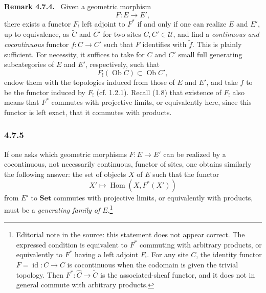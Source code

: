 \documentclass[11pt]{article}
\newcommand{\U}{\mathcal{U}}
\newcommand{\Set}{\mathbf{Set}}
\newcommand{\Hom}{\operatorname{Hom}}
\newcommand{\Ob}{\operatorname{Ob}}
\newenvironment{remarktext}[1]{\par\medskip\noindent\textbf{#1.}\ }{\par\medskip}
\providecommand{\Ob}{\operatorname{Ob}}
\begin{document}
\begin{remarktext}{Remark 4.7.4}
Given a geometric morphism
\[
F:E\longrightarrow E',
\]
there exists a functor \(F_!\) left adjoint to \(F^\ast\) if and only if one can realize \(E\) and \(E'\), up to equivalence, as \(\widetilde C\) and \(\widetilde{C'}\) for two sites \(C,C'\in\U\), and find a \emph{continuous and cocontinuous} functor \(f:C\to C'\) such that \(F\) identifies with \(\widetilde f\). This is plainly sufficient. For necessity, it suffices to take for \(C\) and \(C'\) small full generating subcategories of \(E\) and \(E'\), respectively, such that
\[
F_!(\Ob C)\subset \Ob C',
\]
endow them with the topologies induced from those of \(E\) and \(E'\), and take \(f\) to be the functor induced by \(F_!\) (cf. 1.2.1). Recall (1.8) that existence of \(F_!\) also means that \(F^\ast\) commutes with projective limits, or equivalently here, since this functor is left exact, that it commutes with products.
\end{remarktext}

\subsubsection*{4.7.5}
If one asks which geometric morphisms \(F:E\to E'\) can be realized by a cocontinuous, not necessarily continuous, functor of sites, one obtains similarly the following answer: the set of objects \(X\) of \(E\) such that the functor
\[
X'\longmapsto\Hom(X,F^\ast(X'))
\]
from \(E'\) to \(\Set\) commutes with projective limits, or equivalently with products, must be a \emph{generating family of \(E\)}.\footnote{Editorial note in the source: this statement does not appear correct. The expressed condition is equivalent to \(F^\ast\) commuting with arbitrary products, or equivalently to \(F^\ast\) having a left adjoint \(F_!\). For any site \(C\), the identity functor \(F=\operatorname{id}:C\to C\) is cocontinuous when the codomain is given the trivial topology. Then \(F^\ast:\widehat C\to\widetilde C\) is the associated-sheaf functor, and it does not in general commute with arbitrary products.}
\end{document}
